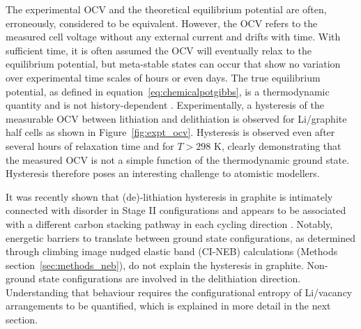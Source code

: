 \documentclass[../main.tex]{subfiles}
\begin{document}
The experimental OCV and the theoretical equilibrium potential are often, erroneously, considered to be equivalent. However, the OCV refers to the measured cell voltage without any external current and drifts with time. With sufficient time, it is often assumed the OCV will eventually relax to the equilibrium potential, but meta-stable states can occur that show no variation over experimental time scales of hours or even days.\cite{Liu2014,orisaka2013,Mercer2021} The true equilibrium potential, as defined in equation~\ref{eq:chemicalpotgibbs}, is a thermodynamic quantity and is not history-dependent \cite{VanderVen2020,Mercer2021}. Experimentally, a hysteresis of the measurable OCV between lithiation and delithiation is observed for Li/graphite half cells \cite{Ohzuku1993,Zheng1995,Dahn1991,Allart2018,Gallagher2012,Yazami_2006,GRIMSMANN201817,didier2020,Mercer2021} as shown in Figure~\ref{fig:expt_ocv}. Hysteresis is observed even after several hours of relaxation time and for $T > 298$ K, clearly demonstrating that the measured OCV is not a simple function of the thermodynamic ground state. Hysteresis therefore poses an interesting challenge to atomistic modellers.

It was recently shown that (de)-lithiation hysteresis in graphite is intimately connected with disorder in Stage II configurations and appears to be associated with a different carbon stacking pathway in each cycling direction \cite{Mercer2021}. Notably, energetic barriers to translate between ground state configurations, as determined through climbing image nudged elastic band (CI-NEB) calculations (Methods section~\ref{sec:methods_neb}), do not explain the hysteresis in graphite. Non-ground state configurations are involved in the delithiation direction. Understanding that behaviour requires the configurational entropy of Li/vacancy arrangements to be quantified, which is explained in more detail in the next section.  
\end{document}

